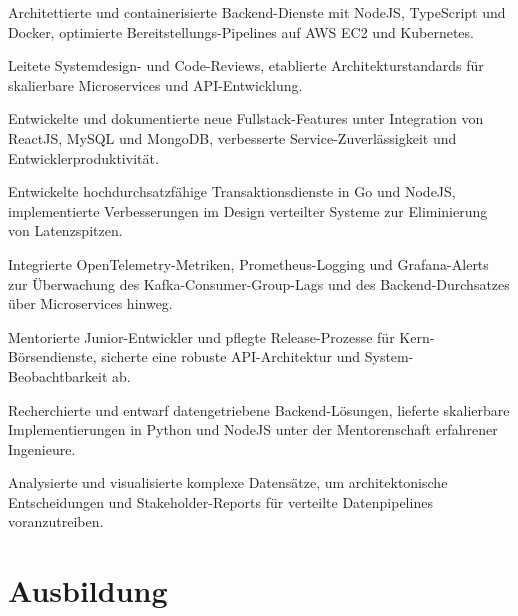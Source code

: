 \documentclass[10pt,a4paper]{resume}
\begin{document}
\bullets
  \item Architettierte und containerisierte Backend-Dienste mit NodeJS, TypeScript und Docker, optimierte Bereitstellungs-Pipelines auf AWS EC2 und Kubernetes.
  \item Leitete Systemdesign- und Code-Reviews, etablierte Architekturstandards für skalierbare Microservices und API-Entwicklung.
  \item Entwickelte und dokumentierte neue Fullstack-Features unter Integration von ReactJS, MySQL und MongoDB, verbesserte Service-Zuverlässigkeit und Entwicklerproduktivität.
\bulletsend
\vspace{1.5pt}
\bullets
  \item Entwickelte hochdurchsatzfähige Transaktionsdienste in Go und NodeJS, implementierte Verbesserungen im Design verteilter Systeme zur Eliminierung von Latenzspitzen.
  \item Integrierte OpenTelemetry-Metriken, Prometheus-Logging und Grafana-Alerts zur Überwachung des Kafka-Consumer-Group-Lags und des Backend-Durchsatzes über Microservices hinweg.
  \item Mentorierte Junior-Entwickler und pflegte Release-Prozesse für Kern-Börsendienste, sicherte eine robuste API-Architektur und System-Beobachtbarkeit ab.
\bulletsend
\vspace{1.5pt}
\bullets
  \item Recherchierte und entwarf datengetriebene Backend-Lösungen, lieferte skalierbare Implementierungen in Python und NodeJS unter der Mentorenschaft erfahrener Ingenieure.
  \item Analysierte und visualisierte komplexe Datensätze, um architektonische Entscheidungen und Stakeholder-Reports für verteilte Datenpipelines voranzutreiben.
\bulletsend
\vspace{1.5pt}

\section{Ausbildung}

\vspace{2pt}
\end{document}
